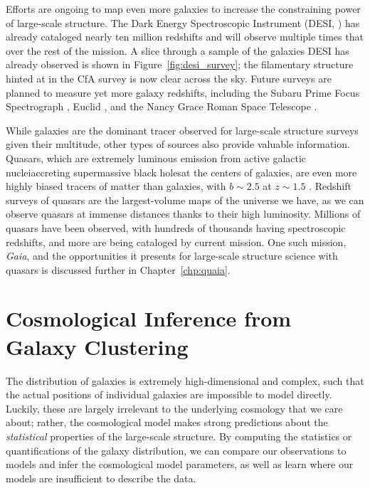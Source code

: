 Efforts are ongoing to map even more galaxies to increase the constraining power of large-scale structure.
The Dark Energy Spectroscopic Instrument (DESI, \citealt{Aghamousa2016}) has already cataloged nearly ten million redshifts and will observe multiple times that over the rest of the mission.
A slice through a sample of the galaxies DESI has already observed is shown in Figure~\ref{fig:desi_survey}; the filamentary structure hinted at in the CfA survey is now clear across the sky.
Future surveys are planned to measure yet more galaxy redshifts, including the Subaru Prime Focus Spectrograph \citep{takada_extragalactic_2014}, Euclid \citep{Laureijs2011}, and the Nancy Grace Roman Space Telescope \citep{Green2012}.

While galaxies are the dominant tracer observed for large-scale structure surveys given their multitude, other types of sources also provide valuable information.
Quasars, which are extremely luminous emission from active galactic nuclei{\emdash}accreting supermassive black holes{\emdash}at the centers of galaxies, are even more highly biased tracers of matter than galaxies, with $b \sim 2.5$ at $z \sim 1.5$ \citep{laurent_clustering_2017-3}.
Redshift surveys of quasars are the largest-volume maps of the universe we have, as we can observe quasars at immense distances thanks to their high luminosity.
Millions of quasars have been observed, with hundreds of thousands having spectroscopic redshifts, and more are being cataloged by current mission.
One such mission, \emph{Gaia}, and the opportunities it presents for large-scale structure science with quasars is discussed further in Chapter~\ref{chp:quaia}.



\section{Cosmological Inference from Galaxy Clustering}

The distribution of galaxies is extremely high-dimensional and complex, such that the actual positions of individual galaxies are impossible to model directly.
Luckily, these are largely irrelevant to the underlying cosmology that we care about; rather, the cosmological model makes strong predictions about the \emph{statistical} properties of the large-scale structure.
By computing the statistics or quantifications of the galaxy distribution, we can compare our observations to models and infer the cosmological model parameters, as well as learn where our models are insufficient to describe the data.

